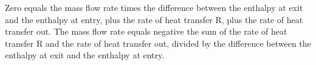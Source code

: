 Zero equals the mass flow rate times the difference between the enthalpy at exit and the enthalpy at entry, plus the rate of heat transfer R, plus the rate of heat transfer out. The mass flow rate equals negative the sum of the rate of heat transfer R and the rate of heat transfer out, divided by the difference between the enthalpy at exit and the enthalpy at entry.